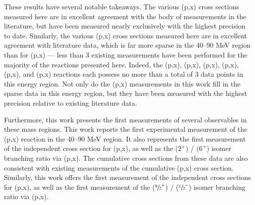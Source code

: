 \documentclass[3p]{elsarticle}
\begin{document}
These results have several notable takeaways.
The various (p,x) cross sections measured here are in excellent agreement with the body of measurements in the literature,  but have been measured nearly exclusively with the highest precision to date.
Similarly, the various (p,x) cross sections measured here are in excellent agreement with literature data, which is far more sparse in the 40--90 MeV region than for (p,x) ---  less than 3 existing measurements have been performed for the majority of the reactions presented here.
Indeed,  the (p,x), (p,x), (p,x), (p,x), (p,x), and (p,x) reactions each possess no more than a total of 3 data points in this energy region.
Not only do the (p,x) measurements in this work fill in the sparse data in this energy region, but they have been measured with the highest precision relative to existing literature data.



Furthermore, this work presents the first measurements of several observables in these mass regions.
This work reports the first experimental measurement of the (p,x) reaction in the 40--90 MeV region.
It also represents  the first measurement of the independent cross section for       (p,x), as well as the  ($2^+$) /   ($6^+$)  isomer branching ratio via (p,x).  
The cumulative cross sections from these data are also consistent with existing measurements of the cumulative (p,x) cross section.
Similarly, this work offers the first measurement of the independent cross sections for (p,x),  as well as the first measurement of the      ($\sfrac{9}{2}^+$) /   ($\sfrac{1}{2}^-$) isomer branching ratio via (p,x).
\end{document}
